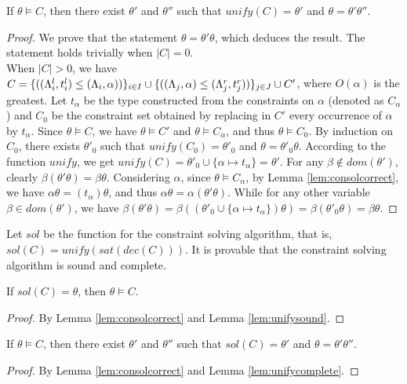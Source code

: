 {{{\begin{lemma}\label{lem:unifycomplete}
If $\theta \vDash C$, then there exist $\theta'$ and $\theta''$ such that $unify(C) = \theta'$ and $\theta = \theta'\theta''$.
\end{lemma}
\begin{proof}
We prove that the statement $\theta = \theta'\theta$, which deduces the result. The statement holds trivially when $|C| = 0$. \\
When $|C| > 0$, we have $C = \{((\Lambda_i^l,t_i^l)\leq(\Lambda_i,\alpha))\}_{i\in I} \cup \{((\Lambda_j,\alpha)\leq(\Lambda_j^r,t_j^r))\}_{j\in J}\cup C'$, where $O(\alpha)$ is the greatest.
Let $t_\alpha$ be the type constructed from the constraints on $\alpha$ (denoted as $C_{\alpha}$) and $C_0$ be the constraint set obtained by replacing in $C'$ every occurrence of $\alpha$ by $t_{\alpha}$.
Since $\theta \vDash C$, we have $\theta\vDash C'$ and $\theta \vDash  C_{\alpha}$,
and  thus $\theta\vDash C_0$.
By induction on $C_0$, there exists $\theta'_0$ such that $unify(C_0) = \theta'_0$ and $\theta = \theta'_0\theta$.
According to the function $unify$, we get $unify(C) = \theta'_0\cup\{\alpha\mapsto t_\alpha\} =\theta'$.
For any $\beta\notin dom(\theta')$, clearly $\beta(\theta'\theta) = \beta\theta$.
Considering $\alpha$, since $\theta\vDash C_{\alpha}$, by Lemma \ref{lem:consolcorrect}, we have $\alpha\theta =  (t_\alpha)\theta$, and thus $\alpha\theta = \alpha(\theta'\theta)$.
While for any other variable $\beta \in dom(\theta')$, we have
$\beta(\theta'\theta) = \beta((\theta'_0\cup\{\alpha\mapsto t_\alpha\})\theta)
= \beta(\theta'_0\theta)=\beta\theta$.
\end{proof}


Let $sol$ be the function for the constraint solving algorithm, that is, $sol(C) = unify(sat(dec(C)))$.
It is provable that the constraint solving algorithm is sound and complete.

\begin{lemma}\label{lem:solsound}
If $sol(C) = \theta$, then $\theta \vDash C$.
\end{lemma}
\begin{proof}
By Lemma  \ref{lem:consolcorrect} and Lemma \ref{lem:unifysound}.
\end{proof}

\begin{lemma}\label{lem:solcomplete}
If $\theta \vDash C$, then there exist $\theta'$ and $\theta''$ such that $sol(C) = \theta'$ and $\theta = \theta'\theta''$.
\end{lemma}
\begin{proof}
By Lemma  \ref{lem:consolcorrect} and Lemma \ref{lem:unifycomplete}.
\end{proof}


}}}
